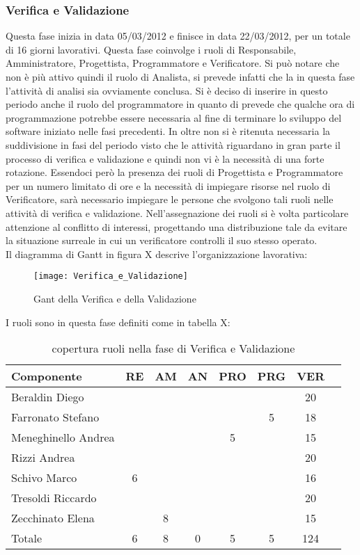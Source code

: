 \subsubsection{Verifica e Validazione}
Questa fase inizia in data 05/03/2012 e finisce in data 22/03/2012, per un totale di 16 giorni lavorativi.
Questa fase coinvolge i ruoli di Responsabile, Amministratore, Progettista, Programmatore e Verificatore. Si può notare che non è più attivo quindi il ruolo di Analista, si prevede infatti che la in questa fase l’attività di analisi sia ovviamente conclusa.
Si è deciso di inserire  in questo periodo anche il ruolo del programmatore in quanto di prevede che qualche ora di programmazione potrebbe essere necessaria al fine di terminare lo sviluppo del software iniziato nelle fasi precedenti.
In oltre non si è ritenuta necessaria la suddivisione in fasi del periodo visto che le attività riguardano in gran parte il processo di verifica e validazione e quindi non vi è la necessità di una forte rotazione.
Essendoci però la presenza dei ruoli di Progettista e Programmatore per un numero limitato di ore e la necessità di impiegare risorse nel ruolo di Verificatore, sarà necessario impiegare le persone che svolgono tali ruoli nelle attività di verifica e validazione.  
Nell’assegnazione dei ruoli si è volta particolare attenzione al conflitto di interessi,  progettando una distribuzione tale da evitare la situazione surreale in cui un verificatore controlli il suo stesso operato.\\
Il diagramma di Gantt in figura X descrive l'organizzazione lavorativa:\\
\begin{figure}[h]
  \texttt{[image: Verifica\_e\_Validazione]}
\caption{Gant della Verifica e della Validazione}
\end{figure}
I ruoli sono in questa fase definiti come in tabella X:\\
\begin{table}[h]
\centering
\begin{tabular}{|l|c|c|c|c|c|cl|}
\hline
Componente& RE& AM& AN& PRO& PRG& VER& \\
\hline
Beraldin Diego & & & & & & 20&\\
Farronato Stefano & & & & & 5& 18&\\
Meneghinello Andrea & & & & 5& & 15&\\
Rizzi Andrea & & & & & & 20&\\
Schivo Marco & 6& & & & & 16&\\
Tresoldi Riccardo & & & & & & 20&\\
Zecchinato Elena & & 8& & & & 15&\\
\hline
Totale & 6& 8& 0& 5& 5& 124&\\
\hline
\end{tabular}
\caption{copertura ruoli nella fase di Verifica e Validazione}
\end{table}
